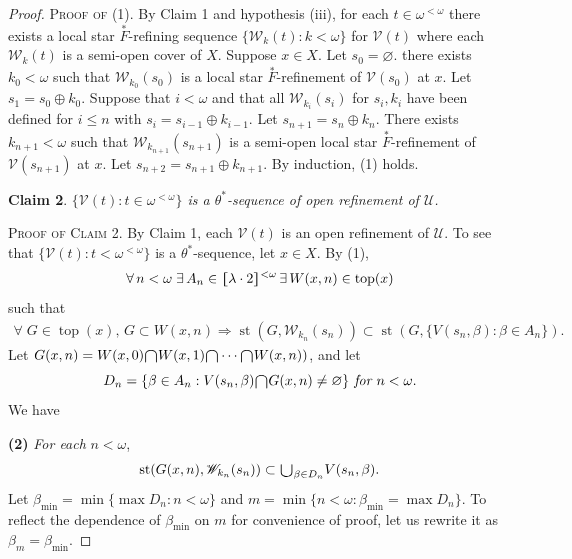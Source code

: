\documentclass[jisng7iii.tex]{subfiles}
\begin{document}
\begin{proof}
\noindent\textsc{Proof of (1)}.  By Claim 1 and hypothesis (iii), for each $t \in \omega^{<\omega}$ 
there exists a local star 
$\overset{*}{F}$-refining sequence $\{\mathscr{W}_k(t): k < \omega\}$ for $\mathscr{V}(t)$ 
where each $\mathscr{W}_k(t)$ 
is a semi-open cover of  $X$. Suppose $x\in X$. Let $s_0 = \varnothing$. 
there exists $k_0 < \omega$ such that $\mathscr{W}_{k_0}(s_0)$ is a local star 
$\overset{*}{F}$-refinement 
of $\mathscr{V}(s_0)$ at $x$. Let $s_1 = s_0 \oplus k_0$. 
Suppose that $i<\omega$ and that all $\mathscr{W}_{k_i}(s_i)$ for $s_i, k_i$ have 
been defined for $i \le n$ with $s_i = s_{i-1}\oplus k_{i-1}$. 
Let $s_{n+1} = s_n \oplus k_n$. There exists 
$k_{n+1} < \omega$ such that  
$\mathscr{W}_{k_{n+1}}(s_{n+1})$ is a semi-open local star $\overset{*}{F}$-refinement 
of $\mathscr{V}(s_{n+1})$  at $x$. Let $s_{n+2} = s_{n+1} \oplus k_{n+1}$. By induction, 
(1) holds.

\textbf{Claim 2}. 
 \textit{$\{\mathscr{V}(t): t \in \omega^{<\omega}\}$ is a $\theta^*$-sequence of open refinement of $\mathscr{U}$.}
 
 \noindent\textsc{Proof of Claim 2.} By Claim 1,  each $\mathscr{V}(t)$ is an open refinement of $\mathscr{U}$. 
 To see that $\{\mathscr{V}(t):  t < \omega^{<\omega}\}$ is a $\theta^*$-sequence, 
 let $x \in X$. By (1), 
\begin{gather*}
	\forall \, n < \omega \; \exists \, A_n\in \hstretch{1.8}{[}\lambda\cdot 2\hstretch{1.8}{]}^{<\omega} \,
	\exists \, W(x,n) \in \operatorname{top}(x)
\end{gather*}
such that 
\begin{gather*}
	\forall\; G \in  \operatorname{top}(x), \, G\subset W(x,n) \Rightarrow 
	\operatorname{st}(G, \mathscr{W}_{k_n}(s_n)) \subset 
	\operatorname{st}(G, \{V(s_n, \beta): \beta \in A_n\}). 
\end{gather*}
Let $G(x, n) = W(x,0) \raisebox{-2pt}{\scalebox{1.5}{$\cap$}}  W(x, 1)
 \raisebox{-2pt}{\scalebox{1.5}{$\cap$}}\cdots \raisebox{-2pt}{\scalebox{1.5}{$\cap$}} W(x, n))$, 
 and let
$$ D_n = \{\beta\in A_n: V(s_n, \beta)\raisebox{-2pt}{\scalebox{1.5}{$\cap$}} G(x, n) \ne \varnothing\} \textit{ for } n < \omega.$$
We have 

\textbf{(2)} \textit{For each } $n < \omega$,
$$	\operatorname{st}(G(x, n), \mathscr{W}_{k_n}(s_n)) \subset 
   \raisebox{-2pt}{\scalebox{1.5}{$\cup$}}_{\beta\in D_n} V(s_n, \beta).$$ 
 Let $\beta_{\min} = \min\{\max D_n: n < \omega\}$ and 
 $m = \min\{n < \omega: \beta_{\min} = \max D_n\}$. 
To reflect the dependence of $\beta_{\min}$ on $m$ for convenience of proof, 
let us rewrite it as $\beta_m=\beta_{\min}$.
  

\end{proof}
\end{document}
